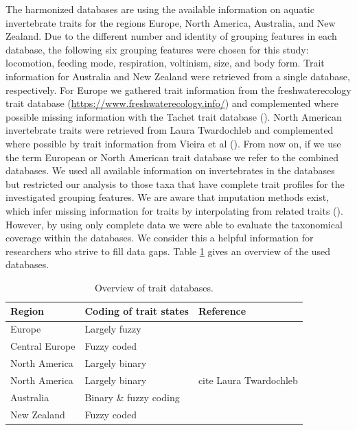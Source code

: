 \documentclass{article}
\begin{document}
The harmonized databases are using the available information on aquatic invertebrate traits for the regions Europe, North America, Australia, and New Zealand. Due to the different number and identity of grouping features in each database, the following six grouping features were chosen for this study: locomotion, feeding mode, respiration, voltinism, size, and body form. 
Trait information for Australia and New Zealand were retrieved from a single database, respectively. For Europe we gathered trait information from the freshwaterecology trait database (\url{https://www.freshwaterecology.info/}) and complemented where possible missing information with the 
Tachet trait database (\cite{usseglio-polatera_biomonitoring_2000}). North American invertebrate traits were retrieved from Laura Twardochleb and 
complemented where possible by trait information from Vieira et al (\cite{vieira_database_nodate}). From now on, if we use the term European or North American trait database we refer to the combined databases. We used all available information on invertebrates in the databases but restricted our analysis to those taxa that have complete trait profiles for the investigated grouping features. We are aware that imputation methods exist, which infer missing information for traits by interpolating from related traits (\cite{penone_imputation_2014}). However, by using only complete data we were able to evaluate the taxonomical coverage within the databases. We consider this a helpful information for researchers who strive to fill data gaps. Table \ref{tab:trait_databases} gives an overview of the used databases. 
\begin{table}[H]
    \centering
    \caption{Overview of trait databases.}
    \label{tab:trait_databases}
    \begin{tabular}{lll}
    \toprule
   Region & Coding of trait states & Reference \\ 
    \hline
   Europe & Largely fuzzy & \cite{schmidt-kloiber_www.freshwaterecology.info_2015}\\ 
   Central Europe & Fuzzy coded & \cite{usseglio-polatera_biomonitoring_2000} \\ 
   North America & Largely binary & \cite{vieira_database_nodate}\\
   North America & Largely binary & cite Laura Twardochleb \\
   Australia & Binary \& fuzzy coding  & \cite{kefford_ben_AST_DB_2019}\\ 
   New Zealand & Fuzzy coded & \\ %
    \bottomrule
    \end{tabular}
\end{table}
\end{document}
